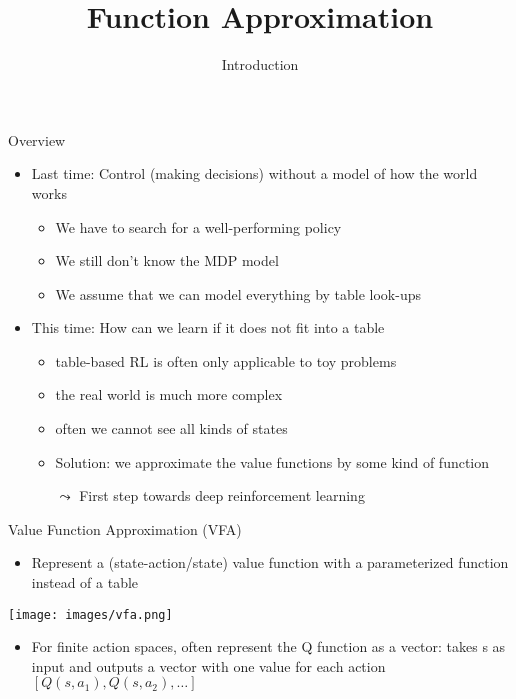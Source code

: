 \documentclass[aspectratio=169]{../latex_main/tntbeamer}  %
\title[RL: Function Approximation]{Function Approximation}
\subtitle{Introduction}
\begin{document}
	
	\maketitle

\begin{frame}[c]{Overview}
	
	
\begin{itemize}
	\item Last time: Control (making decisions) without a model of how the world works
	\begin{itemize}
		\item We have to search for a well-performing policy
		\item We still don't know the MDP model
		\item We assume that we can model everything \alert{by table look-ups}
	\end{itemize}
	\medskip
	\pause
	\item This time: How can we learn if it does not fit into a table
	\begin{itemize}
		\item table-based RL is often only applicable to toy problems
		\item the real world is much more complex
		\item often we cannot see all kinds of states
		\item Solution: we approximate the value functions by some kind of function
		\item[$\leadsto$] First step towards deep reinforcement learning
	\end{itemize}
	
\end{itemize}

\end{frame}
\begin{frame}[c]{Value Function Approximation (VFA)}
	
	
	\begin{itemize}
		\item Represent a (state-action/state) value function with a parameterized
		function instead of a table
	\end{itemize}
	
	\begin{center}
		\texttt{[image: images/vfa.png]}
	\end{center}

	\begin{itemize}
		\item For finite action spaces, often represent the Q function as a vector:
		takes s as input and outputs a vector with one value for each action
		$[Q(s,a_1), Q(s,a_2), \ldots]$
	\end{itemize}
	
\end{frame}
\end{document}
